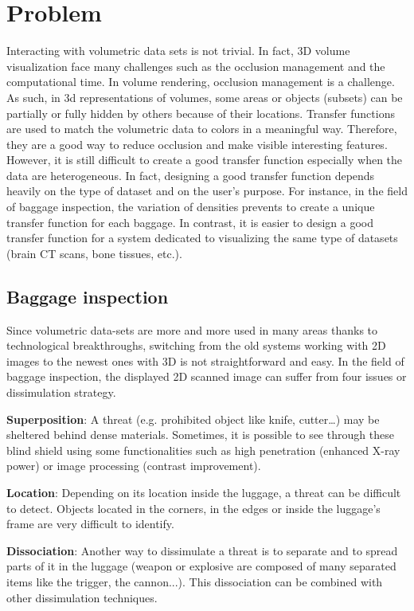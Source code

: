  
 \section{Problem}
 \label{problem}
 
  Interacting with volumetric data sets is not trivial. In fact, 3D volume visualization face many challenges such as the occlusion management and the computational time.
 In volume rendering, occlusion management is a challenge. As such, in 3d representations of volumes, some areas or objects (subsets) can be partially or fully hidden by others because of their locations. Transfer functions are used to match the volumetric data to colors in a meaningful way. Therefore, they are a good way to reduce occlusion and make visible interesting features.  However, it is still difficult to create a good transfer function especially when the data are heterogeneous. In fact, designing a good transfer function depends heavily on the type of dataset and on the user's purpose. For instance, in the field of baggage inspection, the variation of densities prevents to create a unique transfer function for each baggage. In contrast, it is easier to design a good transfer function for a system dedicated to visualizing the same type of datasets (brain CT scans, bone tissues, etc.). 
 
 \subsection{Baggage inspection}
 
  Since volumetric data-sets are more and more used in many areas thanks to technological breakthroughs, switching from the old systems working with 2D images to the newest ones with 3D is not straightforward and easy.  In the field of baggage inspection, the displayed 2D scanned image can suffer from four issues or dissimulation strategy.

\textbf{Superposition}: A threat (e.g. prohibited object like knife, cutter…) may be sheltered behind dense materials. Sometimes, it is possible to see through these blind shield using some functionalities such as high penetration (enhanced X-ray power) or image processing (contrast improvement). 

\textbf{Location}: Depending on its location inside the luggage, a threat can be difficult to detect. Objects located in the corners, in the edges or inside the luggage's frame are very difficult to identify.

\textbf{Dissociation}: Another way to dissimulate a threat is to separate and to spread parts of it in the luggage (weapon or explosive are composed of many separated items like the trigger, the cannon...). This dissociation can be combined with other dissimulation techniques.

